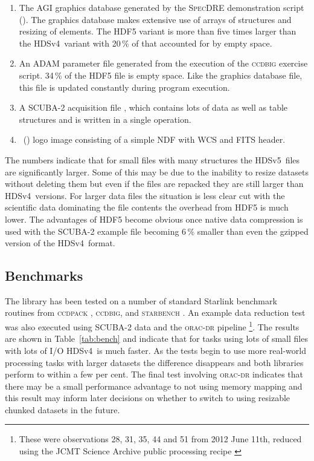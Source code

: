 \documentclass[final,authoryear,5p,times,twocolumn]{elsarticle}
\newcommand{\new}{HDSv5}
\newcommand{\old}{HDSv4}
\begin{document}
\begin{enumerate}
\item The AGI graphics database generated by the \textsc{SpecDRE}
  demonstration script (). The graphics database makes
  extensive use of arrays of structures and resizing of elements. The
  HDF5 variant is more than five times larger than the \old\ variant
  with 20\,\% of that accounted for by empty space.

\item An ADAM parameter file generated from the execution of the
  \textsc{ccdbig} \citep{SSN69} exercise script. 34\,\% of the HDF5
  file is empty space. Like the graphics database file, this file is
  updated constantly during program execution.

\item A SCUBA-2 acquisition file \citep{2014SPIE.9153E..03B}, which contains
  lots of data as well as table structures and is written in a single operation.

\item \KAPPA\ () logo image consisting of a simple NDF
  with WCS and FITS header.
\end{enumerate}

The numbers indicate that for small files with many structures the
\new\ files are significantly larger. Some of this may be due to the
inability to resize datasets without deleting them but even if the
files are repacked they are still larger than \old\ versions.  For
larger data files the situation is less clear cut with the scientific
data dominating the file contents the overhead from HDF5 is much
lower. The advantages of HDF5 become obvious once native data
compression is used with the SCUBA-2 example file becoming 6\,\%
smaller than even the gzipped version of the \old\ format.


\subsection{Benchmarks}

The library has been tested on a number of standard Starlink benchmark
routines from \textsc{ccdpack} \citep[][]{SUN139},
\textsc{ccdbig}, and \textsc{starbench} \citep{SSN23}. An example data reduction
test was also executed using SCUBA-2 data and the \textsc{orac-dr}
pipeline \citep[][]{2015A&C.....9...40J}\footnote{These were
  observations 28, 31, 35, 44 and 51  from 2012 June 11th, reduced
  using the JCMT Science Archive public processing recipe
  \citep{2014SPIE9152-93}}. The results are shown in
Table~\ref{tab:bench} and indicate that for tasks using lots of small
files with lots of I/O \old\ is much faster. As the tests begin to use
more real-world processing tasks with larger datasets the difference
disappears and both libraries perform to within a few per cent. The
final test involving \textsc{orac-dr} indicates that there may be a
small performance advantage to not using memory mapping and this
result may inform later decisions on whether to switch to using
resizable chunked datasets in the future.
\end{document}
